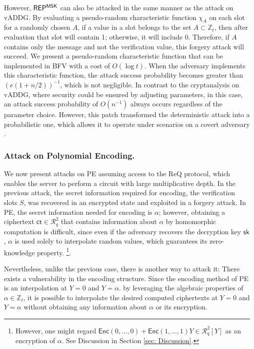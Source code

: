 \documentclass[runningheads]{llncs}
\newcommand{\bb}[1]{\mathbb{#1}}  %
\newcommand{\ct}{\textsf{ct}{}}
\newcommand{\sk}{\textsf{sk}{}}
\newcommand{\REP}{\textsf{REP}{}}
\newcommand{\PE}{\textsf{PE}{}}
\newcommand{\REQ}{\textsf{ReQ}}
\newcommand{\enc}{\textsf{Enc}}
\begin{document}
        However, $\REP^{\sf MSK}$ can also be attacked in the same manner as the attack on vADDG.
        By evaluating a pseudo-random characteristic function \(\chi_A\) on each slot for a randomly chosen $A$, if a value in a slot belongs to the set \(A \subset \mathbb{Z}_t\), then after evaluation that slot will contain 1; otherwise, it will include 0. Therefore, if \(A\) contains only the message and not the verification value, this forgery attack will succeed.
        We present a pseudo-random characteristic function that can be implemented in BFV with a cost of \(O(\log t)\). When the adversary implements this characteristic function, the attack success probability becomes greater than \((e(1+n/2))^{-1}\), which is not negligible. In contrast to the cryptanalysis on vADDG, where security could be ensured by adjusting parameters, in this case, an attack success probability of \(O(n^{-1})\) always occurs regardless of the parameter choice.
        However, this patch transformed the deterministic attack into a probabilistic one, which allows it to operate under scenarios on a covert adversary \cite{Covert}.

        \subsubsection{Attack on Polynomial Encoding.}
        We now present attacks on \PE{} assuming access to the \REQ{} protocol, which enables the server to perform a circuit with large multiplicative depth. In the previous attack, the secret information required for encoding, the verification slots \(S\), was recovered in an encrypted state and exploited in a forgery attack. In \PE{}, the secret information needed for encoding is \(\alpha\); however, obtaining a ciphertext $\ct \in \mathcal{R}^2_q$ that contains information about $\alpha$ by homomorphic computation is difficult, since even if the adversary recovers the decryption key $\sk$, $\alpha$ is used solely to interpolate random values, which guarantees its zero-knowledge property.
        \footnote{However, one might regard \(\enc(0,\dots,0) + \enc(1,\dots,1)Y \in \mathcal{R}^2_q[Y]\) as an encryption of \(\alpha\). See Discussion in Section \ref{sec: Discussion}.}.
    
        Nevertheless, unlike the previous case, there is another way to attack it: There exists a vulnerability in the encoding structure. Since the encoding method of \PE{} is an interpolation at \(Y=0\) and \(Y=\alpha\). by leveraging the algebraic properties of \(\alpha\in \bb Z_t\), it is possible to interpolate the desired computed ciphertexts at \(Y=0\) and \(Y=\alpha\) without obtaining any information about \(\alpha\) or its encryption.
        
\end{document}
